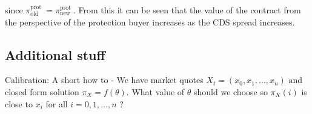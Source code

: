 since $\pi_{\text {old }}^{\text {prot }}=\pi_{\text {new }}^{\text {prot }}$. From this it can be seen that the value of the contract from the perspective of the protection buyer increases as the CDS spread increases.

\subsection{Additional stuff}
Calibration: A short how to - We have market quotes $X_{t}=\left(x_{0}, x_{1}, \ldots, x_{n}\right)$ and closed form solution $\pi_{X}=f(\theta)$. What value of $\theta$ should we choose so $\pi_{X}(i)$ is close to $x_{i}$ for all $i=0,1, \ldots, n$ ?

